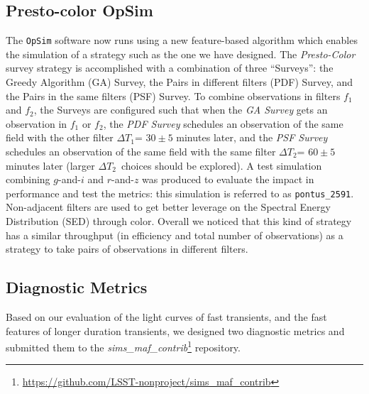 \documentclass[letterpaper,longauthor,trackchanges,twocolumn,onecolappendix,sort&compress]{aastex62}
\newcommand{\dtone}{\ensuremath{\Delta T_1}}
\newcommand{\dttwo}{\ensuremath{\Delta T_2}}
\begin{document}
\subsection{Presto-color OpSim}

The {\tt OpSim} software now runs using a new feature-based algorithm which enables the simulation of a strategy such as the one we have designed. The {\em Presto-Color} survey strategy is accomplished with a combination of three ``Surveys'': the Greedy Algorithm (GA) Survey, the Pairs in different filters (PDF) Survey, and the Pairs in the same filters (PSF) Survey. To combine observations in filters $f_1$ and $f_2$, the Surveys are configured such that when the {\it GA Survey} gets an observation in $f_1$ or $f_2$, the {\it PDF Survey} schedules an observation of the same field with the other filter \dtone = $30 \pm 5$ minutes later, and the {\it PSF Survey} schedules an observation of the same field with the same filter \dttwo = $60 \pm 5$ minutes later (larger \dttwo\ choices should be explored). A test simulation combining $g$-and-$i$ and $r$-and-$z$ was produced to evaluate the impact in performance and test the metrics: this simulation is referred to as {\tt pontus\_2591}. Non-adjacent filters are used to get better leverage on the Spectral Energy Distribution (SED) through color. Overall we noticed that this kind of strategy has a similar throughput (in efficiency and total number of observations) as a strategy to take pairs of observations in different filters. 


\subsection{Diagnostic Metrics}

Based on our evaluation of the light curves of fast transients, and the fast features of longer duration transients, we designed two diagnostic metrics and submitted them to the {\em sims\_maf\_contrib}\footnote{\url{https://github.com/LSST-nonproject/sims\_maf\_contrib}} repository.
\end{document}
